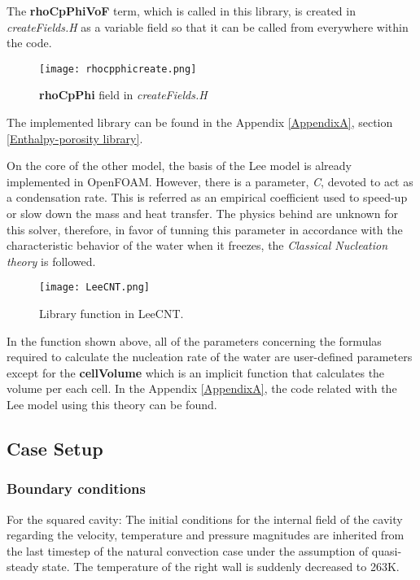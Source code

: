 The \textbf{rhoCpPhiVoF} term, which is called in this library, is created in \textit{createFields.H} as a variable field so that it can be called from everywhere within the code.
\clearpage
\begin{figure}[h!]
	\centering
	\texttt{[image: rhocpphicreate.png]}\hfill	
	\caption{\textbf{rhoCpPhi} field in \textit{createFields.H}}
	\label{3.10fig}
\end{figure}
 
\noindent The implemented library can be found in the Appendix \ref{AppendixA}, section \ref{Enthalpy-porosity library}. 

\noindent On the core of the other model, the basis of the Lee model is already implemented in OpenFOAM. However, there is a parameter, \textit{C}, devoted to act as a condensation rate. This is referred as an empirical coefficient used to speed-up or slow down the mass and heat transfer. The physics behind are unknown for this solver, therefore, in favor of tunning this parameter in accordance with the characteristic behavior of the water when it freezes, the \textit{Classical Nucleation theory} is followed.
\newline
\begin{figure}[h!]
	\centering
	\texttt{[image: LeeCNT.png]}\hfill	
	\caption{Library function in LeeCNT.}
	\label{3.11fig}
\end{figure}
\newline
In the function shown above, all of the parameters concerning the formulas required to calculate the nucleation rate of the water are user-defined parameters except for the \textbf{cellVolume} which is an implicit function that calculates the volume per each cell. In the Appendix \ref{AppendixA}, the code related with the Lee model using this theory can be found.

\subsection{Case Setup}
\subsubsection*{Boundary conditions}

For the squared cavity:
The initial conditions for the internal field of the cavity regarding the velocity, temperature and pressure magnitudes are inherited from the last timestep of the natural convection case under the assumption of quasi-steady state. The temperature of the right wall is suddenly decreased to 263K.

